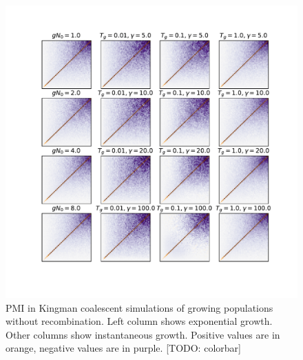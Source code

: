 \documentclass[11pt, letterpaper]{article}   	%
\begin{document}
\begin{figure}
\centering
\includegraphics[width=\textwidth]{figures/pmi_growth_r0.pdf}
\caption{PMI in Kingman coalescent simulations of growing populations without recombination. Left column shows exponential growth. Other columns show instantaneous growth. Positive values are in orange, negative values are in purple. [TODO: colorbar]\label{fig:pmi_growth_r0}}
\end{figure}
\end{document}

